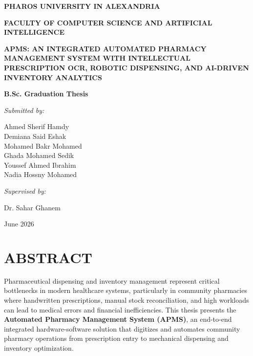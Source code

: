 \documentclass[12pt,a4paper,oneside]{report}
\author{}
\date{}
\begin{document}
\begin{titlepage}
\centering
\vspace*{1cm}
{\fontsize{16}{20}\bfseries\MakeUppercase{Pharos University in Alexandria}\par}
\vspace{0.3cm}
{\fontsize{14}{18}\bfseries\MakeUppercase{Faculty of Computer Science and Artificial Intelligence}\par}
\vspace{2cm}
{\fontsize{16}{20}\bfseries\MakeUppercase{APMS: An Integrated Automated Pharmacy Management System with Intellectual Prescription OCR, Robotic Dispensing, and AI-Driven Inventory Analytics}\par}
\vspace{1.5cm}
{\fontsize{14}{18}\bfseries B.Sc. Graduation Thesis\par}
\vspace{1.5cm}
{\large \emph{Submitted by:}\par}
\vspace{0.3cm}
{\large
Ahmed Sherif Hamdy\\
Demiana Said Eshak\\
Mohamed Bakr Mohamed\\
Ghada Mohamed Sedik\\
Youssef Ahmed Ibrahim\\
Nadia Hossny Mohamed\par}
\vspace{1cm}
{\large \emph{Supervised by:}\par}
\vspace{0.3cm}
{\large Dr. Sahar Ghanem\par}
\vfill
{\large June 2026\par}
\end{titlepage}


\chapter*{ABSTRACT}
Pharmaceutical dispensing and inventory management represent critical
bottlenecks in modern healthcare systems, particularly in community
pharmacies where handwritten prescriptions, manual stock reconciliation,
and high workloads can lead to medical errors and financial
inefficiencies. This thesis presents the \textbf{Automated Pharmacy
Management System (APMS)}, an end-to-end integrated hardware-software
solution that digitizes and automates community pharmacy operations from
prescription entry to mechanical dispensing and inventory optimization.
\end{document}
